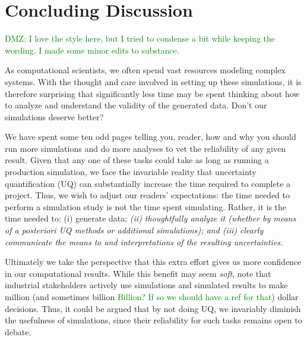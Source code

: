 \section{Concluding Discussion}

\textcolor{green}{DMZ: I love the style here, but I tried to condense a bit while keeping the wording.  I made some minor edits to substance.}

As computational scientists, we often spend vast resources modeling complex systems.  With the thought and care involved in setting up these simulations, it is therefore surprising that  significantly less time may be spent thinking about how to analyze and understand the validity of the generated data.  Don't our simulations deserve better? 

We have spent some ten odd pages telling you, reader, how and why you should run more simulations and do more analyses to vet the reliability of any given result.  Given that any one of these tasks could take as long as running a production simulation, we face the invariable reality that uncertainty quantification (UQ) can substantially increase the time required to complete a project.
Thus, we wish to adjust our readers' expectations: the time needed to perform a simulation study is not the time spent simulating.  Rather, it is the time needed to: (i) generate data; {\it (ii) thoughtfully analyze it (whether by means of a posteriori UQ methods or additional simulations); and (iii) clearly communicate the means to and interpretations of the resulting uncertainties.}


Ultimately we take the perspective that this extra effort gives us more confidence in our computational results.  While this benefit may seem {\it soft}, note that industrial stakeholders actively use simulations and simulated results to make million (and sometimes billion \textcolor{green}{Billion?  If so we should have a ref for that}) dollar decisions.  Thus, it could be argued that by not doing UQ, we invariably diminish the usefulness of simulations, since their reliability for such tasks remains open to debate.  

